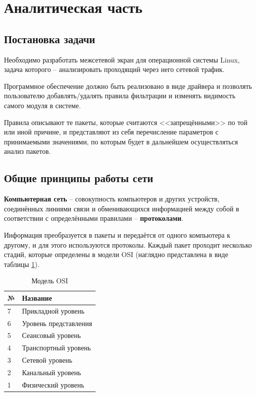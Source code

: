 \section{Аналитическая часть}

\subsection{Постановка задачи}
Необходимо разработать межсетевой экран для операционной системы Linux, задача которого -- анализировать проходящий через него сетевой трафик.

Программное обеспечение должно быть реализовано в виде драйвера и позволять пользователю добавлять/удалять правила фильтрации и изменять видимость самого модуля в системе. 

Правила описывают те пакеты, которые считаются <<запрещёнными>> по той или иной причине, и представляют из себя перечисление параметров с принимаемыми значениями, по которым будет в дальнейшем осуществляться анализ пакетов. \newline

\subsection{Общие принципы работы сети}
\textbf{Компьютерная сеть} -- совокупность компьютеров и других устройств, соединённых линиями связи и обменивающихся информацией между собой в соответствии с определёнными правилами -- \textbf{протоколами}. \cite{net}

Информация преобразуется в пакеты и передаётся от одного компьютера к другому, и для этого используются протоколы. Каждый пакет проходит несколько стадий, которые определены в модели OSI (наглядно представлена в виде таблицы \ref{osi_table}).

\begin{table}[h]
	\begin{center}
		\caption{Модель OSI}
		\label{osi_table}
		\begin{tabular}{| p{1cm} | p{7cm} |}
			\hline
			\textbf{№} 	& \textbf{Название} \\
			\hline
			7 				& Прикладной уровень\\ 
			\hline
			6 				& Уровень представления  \\ 
			\hline
			5 		& Сеансовый уровень \\ 
			\hline
			4 		& Транспортный уровень \\ 
			\hline
			3 		& Сетевой уровень \\ 
			\hline
			2 		& Канальный уровень \\ 
			\hline
			1 		& Физический уровень \\ 
			\hline
		\end{tabular}
	\end{center}
\end{table} 

